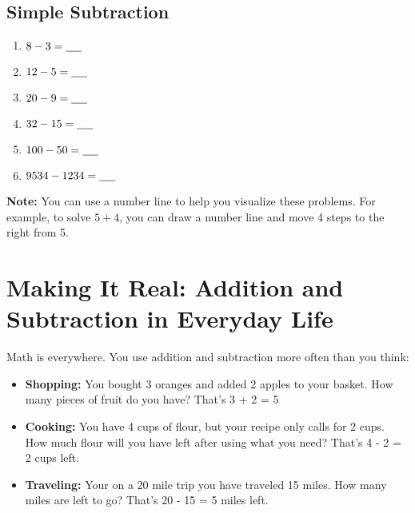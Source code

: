 \subsection{Simple Subtraction}
\begin{enumerate}[label=\alph*)]
    \item $8 - 3 = \underline{\hspace{0.5cm}}$
    \item $12 - 5 = \underline{\hspace{0.5cm}}$
    \item $20 - 9 = \underline{\hspace{0.5cm}}$
    \item $32 - 15 = \underline{\hspace{0.5cm}}$
    \item $100 - 50 = \underline{\hspace{0.5cm}}$
    \item $9534 - 1234 = \underline{\hspace{0.5cm}}$
\end{enumerate}

\noindent
\textbf{Note:} You can use a number line to help you visualize these problems. For example, to solve $5 + 4$, you can draw a number line and move 4 steps to the right from 5.
\noindent
\begin{center}
    \end{center}

\section{Making It Real: Addition and Subtraction in Everyday Life}
Math is everywhere. You use addition and subtraction more often than you think:
\begin{itemize}
    \item \textbf{Shopping:} You bought 3 oranges and added 2 apples to your basket. How many pieces of fruit do you have? That’s 3 + 2 = 5
    \item \textbf{Cooking:} You have 4 cups of flour, but your recipe only calls for 2 cups. How much flour will you have left after using what you need? That’s 4 - 2 = 2 cups left.
    \item \textbf{Traveling:} Your on a 20 mile trip you have traveled 15 miles. How many miles are left to go? That’s 20 - 15 = 5 miles left.
\end{itemize}

